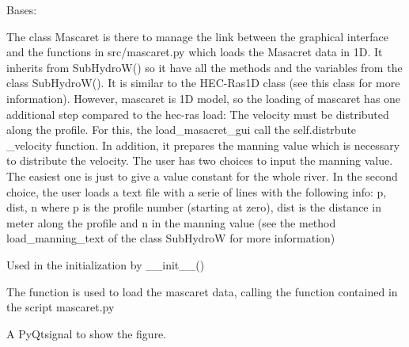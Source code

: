 \documentclass[letterpaper,10pt,english]{sphinxmanual}
\begin{document}
\begin{fulllineitems}
\label{\detokenize{index:src_GUI.hydro_GUI_2.Mascaret}}
Bases: {\hyperref[\detokenize{index:src_GUI.hydro_GUI_2.SubHydroW}]{}}

The class Mascaret is there to manage the link between the graphical interface and the functions in src/mascaret.py
which loads the Masacret data in 1D. It inherits from SubHydroW() so it have all the methods and the variables
from the class SubHydroW(). It is similar to the HEC-Ras1D class (see this class for more information). However, mascaret is 1D model, so the loading
of mascaret has one additional step compared to the hec-ras load: The velocity must be distributed along the
profile. For this, the load\_masacret\_gui call the self.distrbute \_velocity function. In addition, it prepares
the manning value which is necessary to distribute the velocity. The user has two choices to input the manning
value. The easiest one is just to give a value constant for the whole river. In the second choice, the user loads
a text file with a serie of lines with the following info: p, dist, n where p is the profile number
(starting at zero), dist is the distance in meter along the profile and n in the manning value (see the method
load\_manning\_text of the class SubHydroW for more information)

\begin{fulllineitems}
\label{\detokenize{index:src_GUI.hydro_GUI_2.Mascaret.init_iu}}
Used in the initialization by \_\_init\_\_()

\end{fulllineitems}


\begin{fulllineitems}
\label{\detokenize{index:src_GUI.hydro_GUI_2.Mascaret.load_mascaret_gui}}
The function is used to load the mascaret data, calling the function contained in the script mascaret.py

\end{fulllineitems}


\begin{fulllineitems}
\label{\detokenize{index:src_GUI.hydro_GUI_2.Mascaret.show_fig}}
A PyQtsignal to show the figure.

\end{fulllineitems}


\end{fulllineitems}
\end{document}
